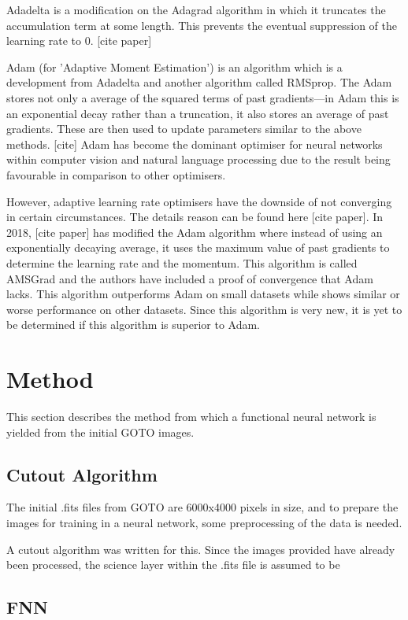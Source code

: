 \documentclass[a4paper,fleqn,usenatbib]{mnras}
\begin{document}
 Adadelta is a modification on the Adagrad algorithm in which it truncates the accumulation term at some length. This prevents the eventual suppression of the learning rate to 0. [cite paper]
 
 Adam (for 'Adaptive Moment Estimation') is an algorithm which is a development from Adadelta and another algorithm called RMSprop. The Adam stores not only a average of the squared terms of past gradients---in Adam this is an exponential decay rather than a truncation, it also stores an average of past gradients. These are then used to update parameters similar to the above methods. [cite] Adam has become the dominant optimiser for neural networks within computer vision and natural language processing due to the result being favourable in comparison to other optimisers. 
 
 However, adaptive learning rate optimisers have the downside of not converging in certain circumstances. The details reason can be found here [cite paper]. In 2018, [cite paper] has modified the Adam algorithm where instead of using an exponentially decaying average, it uses the maximum value of past gradients to determine the learning rate and the momentum. This algorithm is called AMSGrad and the authors have included a proof of convergence that Adam lacks. This algorithm outperforms Adam on small datasets while shows similar or worse performance on other datasets. Since this algorithm is very new, it is yet to be determined if this algorithm is superior to Adam.
 
 
 \section{Method}
This section describes the method from which a functional neural network is yielded from the initial GOTO images.
\subsection{Cutout Algorithm}
The initial .fits files from GOTO are 6000x4000 pixels in size, and to prepare the images for training in a neural network, some preprocessing of the data is needed. 

A cutout algorithm was written for this. Since the images provided have already been processed, the science layer within the .fits file is assumed to be 
\subsection{FNN}
\end{document}
